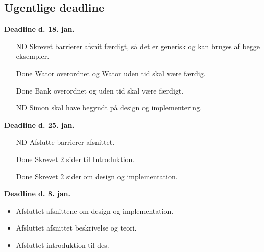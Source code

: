 \subsection*{Ugentlige deadline}
\textbf{Deadline d. 18. jan.}
\begin{itemize}{}{}\tightlist
\item [ND]Skrevet barrierer afsnit færdigt, så det er generisk og kan bruges af begge eksempler.
\item [Done]Wator overordnet og Wator uden tid skal være færdig.
\item [Done]Bank overordnet og uden tid skal være færdigt. 
\item [ND]Simon skal have begyndt på design og implementering.
\end{itemize}

\textbf{Deadline d. 25. jan.}
\begin{itemize}{}{}\tightlist
\item [ND]Afslutte barrierer afsnittet.
\item [Done]Skrevet 2 sider til Introduktion.
\item [Done]Skrevet 2 sider om design og implementation.
\end{itemize} 

\textbf{Deadline d. 8. jan.}
\begin{itemize}{}{}\tightlist
\item Afsluttet afsnittene om design og implementation.
\item Afsluttet afsnittet beskrivelse og teori.
\item Afsluttet introduktion til des.
\end{itemize} 
